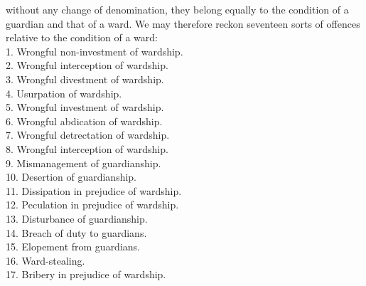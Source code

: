 \documentclass[12pt]{report}
\begin{document}
without any change of denomination, they belong equally to the condition
of a guardian and that of a ward. We may therefore reckon seventeen
sorts of offences relative to the condition of a ward:\\
1. Wrongful non-investment of wardship.\\
2. Wrongful interception of wardship.\\
3. Wrongful divestment of wardship.\\
4. Usurpation of wardship.\\
5. Wrongful investment of wardship.\\
6. Wrongful abdication of wardship.\\
7. Wrongful detrectation of wardship.\\
8. Wrongful interception of wardship.\\
9. Mismanagement of guardianship.\\
10. Desertion of guardianship.\\
11. Dissipation in prejudice of wardship.\\
12. Peculation in prejudice of wardship.\\
13. Disturbance of guardianship.\\
14. Breach of duty to guardians.\\
15. Elopement from guardians.\\
16. Ward-stealing.\\
17. Bribery in prejudice of wardship.
\end{document}

